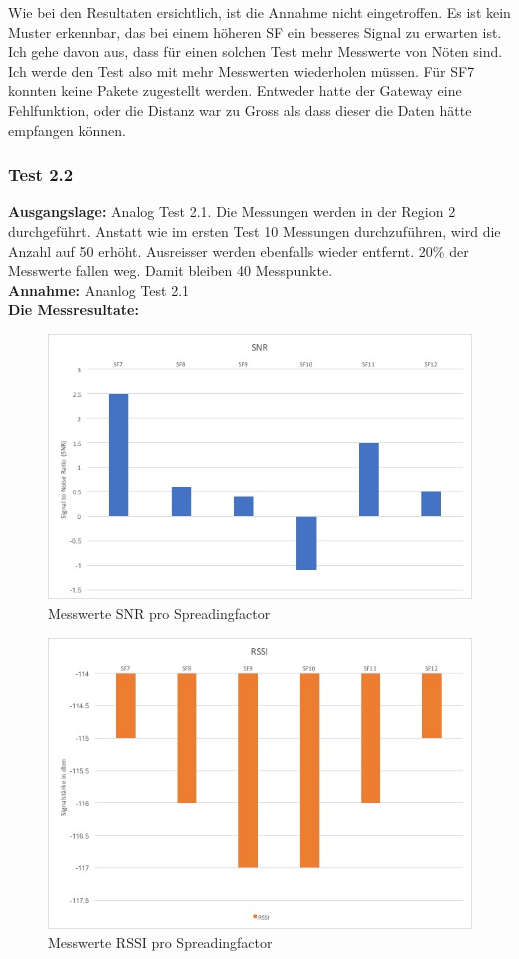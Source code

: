 \documentclass[11pt,english,german]{report}
\theoremstyle{definition}
\begin{document}
\noindent
Wie bei den Resultaten ersichtlich, ist die Annahme nicht eingetroffen. Es ist kein Muster erkennbar, das bei einem höheren SF ein besseres Signal zu erwarten ist. Ich gehe davon aus, dass für einen solchen Test mehr Messwerte von Nöten sind. Ich werde den Test also mit mehr Messwerten wiederholen müssen. Für SF7 konnten keine Pakete zugestellt werden. Entweder hatte der Gateway eine Fehlfunktion, oder die Distanz war zu Gross als dass dieser die Daten hätte empfangen können.
\newpage
\subsubsection{Test 2.2}
\textbf{Ausgangslage:} Analog Test 2.1. Die Messungen werden in der Region 2 durchgeführt. Anstatt wie im ersten Test 10 Messungen durchzuführen, wird die Anzahl auf 50 erhöht. Ausreisser werden ebenfalls wieder entfernt. 20\% der Messwerte fallen weg. Damit bleiben 40 Messpunkte.\\[0.3cm]
\textbf{Annahme:} Ananlog Test 2.1\\[0.3cm]
\textbf{Die Messresultate:}
\begin{figure}[H]
	\centering
	\includegraphics[width=\textwidth]{img/testing/testing2_sf_snr.jpg}
	\caption[Messwerte SNR  pro Spreadingfactor]
	{Messwerte SNR pro Spreadingfactor}
\end{figure}
\begin{figure}[H]
	\centering
	\includegraphics[width=\textwidth]{img/testing/testing2_sf_rssi.jpg}
	\caption[Messwerte RSSI pro Spreadingfactor]
	{Messwerte RSSI pro Spreadingfactor}
\end{figure}
\end{document}
